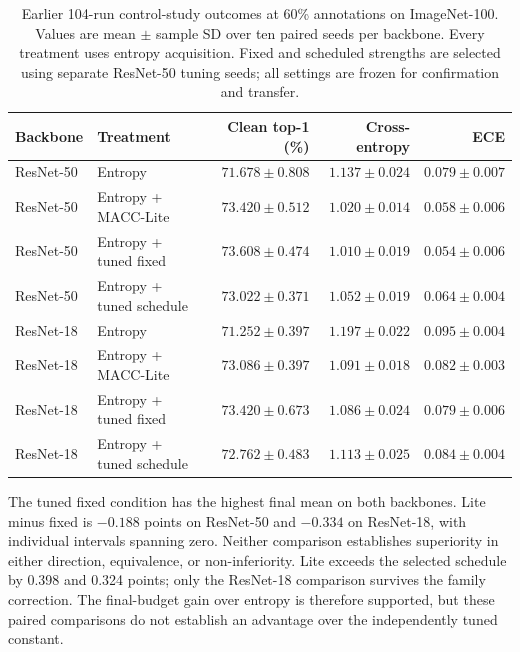 \documentclass[10pt,a4paper,twocolumn]{article}
\begin{document}
\begin{table}[tbp]
\caption{Earlier 104-run control-study outcomes at 60\% annotations on ImageNet-100.
Values are mean $\pm$ sample SD over ten paired seeds per backbone.
Every treatment uses entropy acquisition. Fixed and scheduled strengths
are selected using separate ResNet-50 tuning seeds; all settings are
frozen for confirmation and transfer.}
\label{tab:feedback_endpoints}
\centering\small
\begin{tabularx}{\textwidth}{@{}lYrrr@{}}
\toprule
Backbone & Treatment & Clean top-1 (\%) & Cross-entropy & ECE \\
\midrule
ResNet-50 & Entropy & $71.678\pm0.808$ & $1.137\pm0.024$ & $0.079\pm0.007$ \\
ResNet-50 & Entropy + MACC-Lite & $73.420\pm0.512$ & $1.020\pm0.014$ & $0.058\pm0.006$ \\
ResNet-50 & Entropy + tuned fixed & $73.608\pm0.474$ & $1.010\pm0.019$ & $0.054\pm0.006$ \\
ResNet-50 & Entropy + tuned schedule & $73.022\pm0.371$ & $1.052\pm0.019$ & $0.064\pm0.004$ \\
ResNet-18 & Entropy & $71.252\pm0.397$ & $1.197\pm0.022$ & $0.095\pm0.004$ \\
ResNet-18 & Entropy + MACC-Lite & $73.086\pm0.397$ & $1.091\pm0.018$ & $0.082\pm0.003$ \\
ResNet-18 & Entropy + tuned fixed & $73.420\pm0.673$ & $1.086\pm0.024$ & $0.079\pm0.006$ \\
ResNet-18 & Entropy + tuned schedule & $72.762\pm0.483$ & $1.113\pm0.025$ & $0.084\pm0.004$ \\
\bottomrule
\end{tabularx}
\end{table}

The tuned fixed condition has the highest final mean on both backbones.
Lite minus fixed is $-0.188$ points on ResNet-50 and $-0.334$ on
ResNet-18, with individual intervals spanning zero. Neither comparison
establishes superiority in either direction, equivalence, or
non-inferiority. Lite exceeds the selected schedule by 0.398 and 0.324
points; only the ResNet-18 comparison survives the family correction.
The final-budget gain over entropy is therefore supported, but these
paired comparisons do not establish an advantage over the independently
tuned constant.
\end{document}
